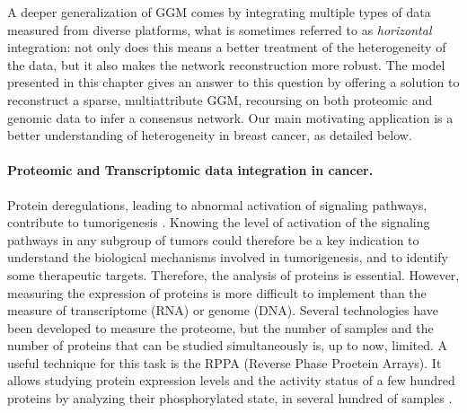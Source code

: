 A deeper generalization of GGM comes by integrating multiple types of
data measured from diverse platforms, what is sometimes referred to as
\emph{horizontal} integration: not only does this means a better
treatment of the heterogeneity of the data, but it also makes the
network reconstruction more robust. The model presented in this
chapter gives an answer to this question by offering a solution to
reconstruct a sparse, multiattribute GGM, recoursing on both proteomic
and genomic data to infer a consensus network. Our main motivating
application is a better understanding of heterogeneity in breast
cancer, as detailed below.

\paragraph*{Proteomic and Transcriptomic data integration in cancer.} 
Protein deregulations, leading to abnormal activation of signaling
pathways, contribute to tumorigenesis
\citep{giancotti2014deregulation}. Knowing the level of activation of
the signaling pathways in any subgroup of tumors could therefore be a
key indication to understand the biological mechanisms involved in
tumorigenesis, and to identify some therapeutic targets.  %
%
Therefore, the analysis of proteins is
essential.  However, measuring the expression of proteins is more
difficult to implement than the measure of transcriptome (RNA) or
genome (DNA).  Several technologies have been developed to measure the
proteome, but the number of samples and the number of proteins that
can be studied simultaneously is, up to now, limited.  A useful
technique for this task is the RPPA (Reverse Phase Proetein
Arrays). It allows studying protein expression levels and the activity
status of a few hundred proteins by analyzing their phosphorylated
state, in several hundred of samples \citep{akbani2014realizing}.

